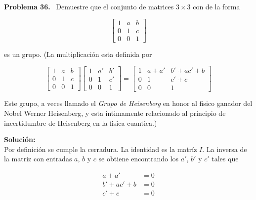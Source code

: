 \documentclass{article}
\newcounter{problem}
\newcounter{solution}
\newcommand\Problem[1]{%
  \stepcounter{problem}%
  \textbf{Problema #1.}~%
  \setcounter{solution}{0}%
}
\newcommand\TheSolution{%
  \textbf{Solución:}\\%
}
\begin{document}
\Problem{36} Demuestre que el conjunto de matrices $3 \times 3$ con de la
forma

\[
\begin{bmatrix}
    1  &  a & b    \\
    0  &  1 & c \\
    0  &  0 & 1
\end{bmatrix}
\]

es un grupo. (La multiplicación esta definida por

\[
\begin{bmatrix}
    1  &  a & b    \\
    0  &  1 & c \\
    0  &  0 & 1
\end{bmatrix}
\begin{bmatrix}
    1  &  a' & b'    \\
    0  &  1 & c' \\
    0  &  0 & 1
\end{bmatrix}
=
\begin{bmatrix}
    1  &  a + a' & b' + ac' + b    \\
    0  &  1 & c' + c \\
    0  &  0 & 1
\end{bmatrix}
\]

Este grupo, a veces llamado el \textit{Grupo de Heisenberg} en honor al fisico
ganador del Nobel Werner Heisenberg, y esta intimamente relacionado al
principio de incertidumbre de Heisenberg en la fisica cuantica.)

\TheSolution{} Por definición se cumple la cerradura. La identidad es la
matríz $I$. La inversa de la matriz con entradas $a$, $b$ y $c$ se obtiene
encontrando los $a'$, $b'$ y $c'$ tales que

\[
\begin{split}
  a + a'       & = 0 \\
  b' + ac' + b & = 0 \\
  c' + c       & = 0
\end{split}
\]
\end{document}
